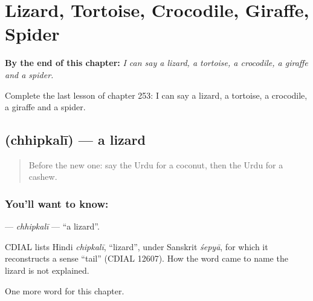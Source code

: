 
\chapter{Lizard, Tortoise, Crocodile, Giraffe, Spider}
\label{ch:ur-lizard-tortoise-crocodile-giraffe-spider}

\begin{chapteropening}
\textbf{By the end of this chapter:} \emph{I can say a lizard, a tortoise, a crocodile, a giraffe and a spider.}

Complete the last lesson of chapter 253: I can say a lizard, a tortoise, a crocodile, a giraffe and a spider.
\end{chapteropening}

\section[\texorpdfstring{\ur{چھپکلی} (chhipkalī)}{چھپکلی (chhipkalī)}]{ (chhipkalī) — a lizard}

\label{lesson:UR-C253-chhipkali}



\begin{quote}
Before the new one: say the Urdu for a coconut, then the Urdu for a cashew.
\end{quote}

\subsection*{You'll want to know: }
\textbf{} — \emph{chhipkalī} — \textquotedblleft{}a lizard\textquotedblright{}.

\begin{cousinweb}
CDIAL lists Hindi \emph{chipkalī}, \textquotedblleft{}lizard\textquotedblright{}, under Sanskrit \emph{śepyā}, for which it reconstructs a sense \textquotedblleft{}tail\textquotedblright{} (CDIAL 12607). How the word came to name the lizard is not explained.
\end{cousinweb}

\begin{grammarlens}[title={What you've built}]
One more word for this chapter.
\end{grammarlens}

